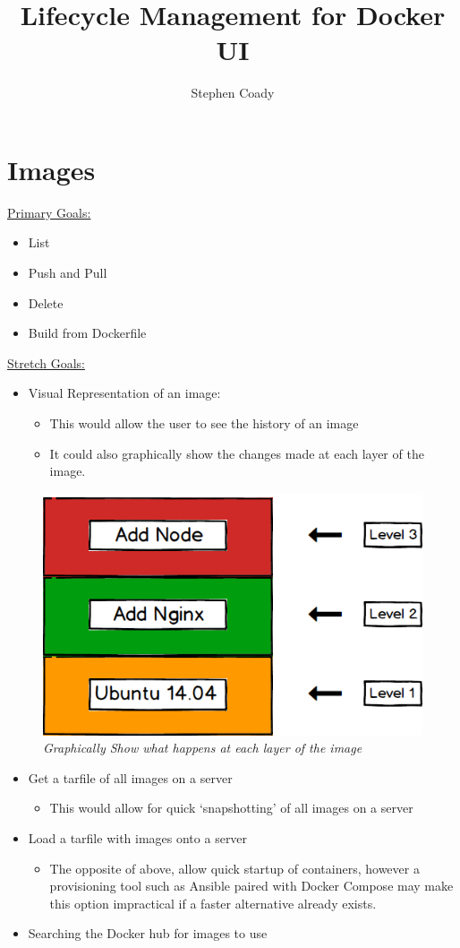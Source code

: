 \documentclass{article}
\author{Stephen Coady}
\title{Lifecycle Management for Docker UI}
\begin{document}
\maketitle
\newpage

\section{Images}

\underline{Primary Goals:} 
\begin{itemize}
	\item List
	\item Push and Pull
	\item Delete
	\item Build from Dockerfile
\end{itemize} 
\underline {Stretch Goals:}
\begin{itemize}
	\item Visual Representation of an image: 
	\begin{itemize}
		\item This would allow the user to see the history of an image
		\item It could also graphically show the changes made at each layer of the image. 
	\end{itemize}
\end{itemize}

\begin{figure}[!hb]
\centering
\includegraphics*[width=.5\textwidth]{components/docker_image_levels}
\caption{\em Graphically Show what happens at each layer of the image}
\label{fig:docker_image_levels}
\end{figure}

\begin{itemize}
	\item Get a tarfile of all images on a server
	\begin{itemize}
		\item This would allow for quick `snapshotting' of all images on a server
	\end{itemize}
	\item Load a tarfile with images onto a server
	\begin{itemize}
		\item The opposite of above, allow quick startup of containers, however a provisioning tool such as Ansible paired with Docker Compose may make this option impractical if a faster alternative already exists.
	\end{itemize}
	\item Searching the Docker hub for images to use
\end{itemize}
\end{document}
